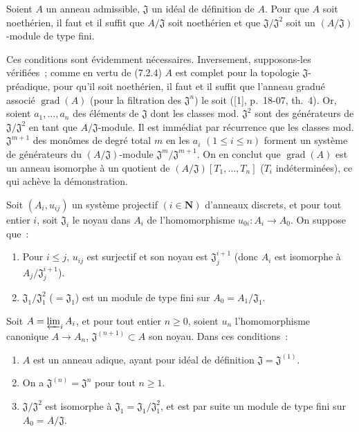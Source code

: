 \begin{corollary}[7.2.6]
\label{0.7.2.6-fr}
Soient $A$ un anneau admissible, $\mathfrak J$ un idéal de définition de $A$.
Pour que $A$ soit noethérien, il faut et il suffit que $A/\mathfrak J$ soit
noethérien et que $\mathfrak J/\mathfrak J^2$ soit un
$(A/\mathfrak J)$-module de type fini.
\end{corollary}

Ces conditions sont évidemment nécessaires. Inversement, supposons-les
vérifiées~; comme en vertu de (7.2.4) $A$ est complet pour la topologie
$\mathfrak J$-préadique, pour qu'il soit noethérien, il faut et il suffit que
l'anneau gradué associé $\operatorname{grad}(A)$ (pour la filtration des
$\mathfrak J^n$) le soit ([1], p.~18-07, th.~4). Or, soient
$a_1,\ldots,a_n$ des éléments de $\mathfrak J$ dont les classes mod.
$\mathfrak J^2$ sont des générateurs de $\mathfrak J/\mathfrak J^2$ en tant
que $A/\mathfrak J$-module. Il est immédiat par récurrence que les classes mod.
$\mathfrak J^{m+1}$ des monômes de degré total $m$ en les $a_i$
$(1\leq i\leq n)$ forment un système de générateurs du
$(A/\mathfrak J)$-module $\mathfrak J^m/\mathfrak J^{m+1}$. On en conclut que
$\operatorname{grad}(A)$ est un anneau isomorphe à un quotient de
$(A/\mathfrak J)[T_1,\ldots,T_n]$ ($T_i$ indéterminées), ce qui achève la
démonstration.

\begin{proposition}[7.2.7]
\label{0.7.2.7-fr}
Soit $(A_i,u_{ij})$ un système projectif $(i\in\mathbf N)$ d'anneaux discrets,
et pour tout entier $i$, soit $\mathfrak J_i$ le noyau dans $A_i$ de
l'homomorphisme $u_{0i}:A_i\to A_0$. On suppose que~:
\begin{enumerate}
  \item[{\upshape a)}] Pour $i\leq j$, $u_{ij}$ est surjectif et son noyau est
    $\mathfrak J_j^{i+1}$ \textup{(donc $A_i$ est isomorphe à
    $A_j/\mathfrak J_j^{i+1}$)}.
  \item[{\upshape b)}] $\mathfrak J_1/\mathfrak J_1^2$ ($=\mathfrak J_1$) est un
    module de type fini sur $A_0=A_1/\mathfrak J_1$.
\end{enumerate}
Soit $A=\varprojlim_i A_i$, et pour tout entier $n\geq0$, soient $u_n$
l'homomorphisme canonique $A\to A_n$, $\mathfrak J^{(n+1)}\subset A$ son
noyau. Dans ces conditions~:
\begin{enumerate}
  \item[{\upshape(i)}] $A$ est un anneau adique, ayant pour idéal de définition
    $\mathfrak J=\mathfrak J^{(1)}$.
  \item[{\upshape(ii)}] On a $\mathfrak J^{(n)}=\mathfrak J^n$ pour tout $n\geq1$.
  \item[{\upshape(iii)}] $\mathfrak J/\mathfrak J^2$ est isomorphe à
    $\mathfrak J_1=\mathfrak J_1/\mathfrak J_1^2$, et est par suite un module
    de type fini sur $A_0=A/\mathfrak J$.
\end{enumerate}
\end{proposition}

